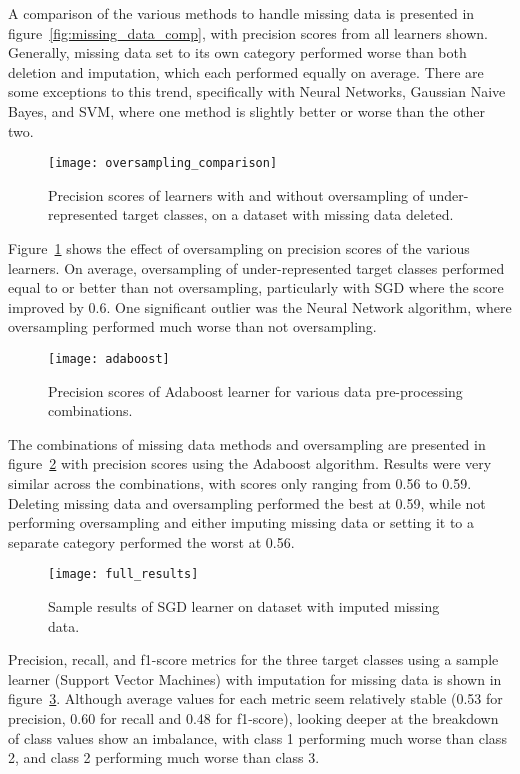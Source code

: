 \documentclass[conference]{IEEEtran}
\begin{document}
A comparison of the various methods to handle missing data is presented in figure~\ref{fig:missing_data_comp}, with precision scores from all learners shown. Generally, missing data set to its own category performed worse than both deletion and imputation, which each performed equally on average. There are some exceptions to this trend, specifically with Neural Networks, Gaussian Naive Bayes, and SVM, where one method is slightly better or worse than the other two.

\begin{figure}[htpb]
	\centering
	\texttt{[image: oversampling\_comparison]}
	\caption{Precision scores of learners with and without oversampling of under-represented target classes, on a dataset with missing data deleted.}
	\label{fig:oversampling_comp}
\end{figure}

Figure~\ref{fig:oversampling_comp} shows the effect of oversampling on precision scores of the various learners. On average, oversampling of under-represented target classes performed equal to or better than not oversampling, particularly with SGD where the score improved by 0.6. One significant outlier was the Neural Network algorithm, where oversampling performed much worse than not oversampling.

\begin{figure}[htpb]
	\centering
	\texttt{[image: adaboost]}
	\caption{Precision scores of Adaboost learner for various data pre-processing combinations.}
	\label{fig:adaboost}
\end{figure}

The combinations of missing data methods and oversampling are presented in figure~\ref{fig:adaboost} with precision scores using the Adaboost algorithm. Results were very similar across the combinations, with scores only ranging from 0.56 to 0.59. Deleting missing data and oversampling performed the best at 0.59, while not performing oversampling and either imputing missing data or setting it to a separate category performed the worst at 0.56.

\begin{figure}[htpb]
	\centering
	\texttt{[image: full\_results]}
	\caption{Sample results of SGD learner on dataset with imputed missing data.}
	\label{fig:full_results}
\end{figure}

Precision, recall, and f1-score metrics for the three target classes using a sample learner (Support Vector Machines) with imputation for missing data is shown in figure~\ref{fig:full_results}. Although average values for each metric seem relatively stable (0.53 for precision, 0.60 for recall and 0.48 for f1-score), looking deeper at the breakdown of class values show an imbalance, with class 1 performing much worse than class 2, and class 2 performing much worse than class 3.
\end{document}
